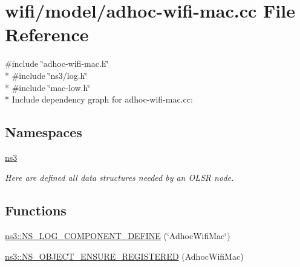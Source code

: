 \hypertarget{adhoc-wifi-mac_8cc}{}\section{wifi/model/adhoc-\/wifi-\/mac.cc File Reference}
\label{adhoc-wifi-mac_8cc}
{\ttfamily \#include \char`\"{}adhoc-\/wifi-\/mac.\+h\char`\"{}}\\*
{\ttfamily \#include \char`\"{}ns3/log.\+h\char`\"{}}\\*
{\ttfamily \#include \char`\"{}mac-\/low.\+h\char`\"{}}\\*
Include dependency graph for adhoc-\/wifi-\/mac.cc\+:
\subsection*{Namespaces}
\begin{DoxyCompactItemize}
\item 
 \hyperlink{namespacens3}{ns3}
\begin{DoxyCompactList}\small\item\em Here are defined all data structures needed by an O\+L\+SR node. \end{DoxyCompactList}\end{DoxyCompactItemize}
\subsection*{Functions}
\begin{DoxyCompactItemize}
\item 
\hyperlink{namespacens3_a4d2eb2740ee8c194bd5a07fa0464b3ce}{ns3\+::\+N\+S\+\_\+\+L\+O\+G\+\_\+\+C\+O\+M\+P\+O\+N\+E\+N\+T\+\_\+\+D\+E\+F\+I\+NE} (\char`\"{}Adhoc\+Wifi\+Mac\char`\"{})
\item 
\hyperlink{namespacens3_a7e62df43bd3d31b286147f513c72bc5d}{ns3\+::\+N\+S\+\_\+\+O\+B\+J\+E\+C\+T\+\_\+\+E\+N\+S\+U\+R\+E\+\_\+\+R\+E\+G\+I\+S\+T\+E\+R\+ED} (Adhoc\+Wifi\+Mac)
\end{DoxyCompactItemize}
